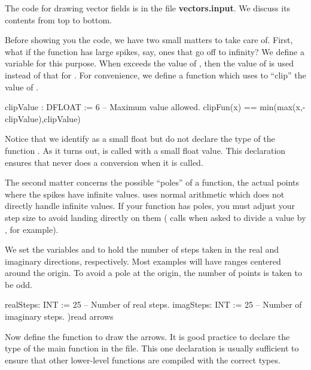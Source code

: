 The code for drawing vector fields is in the file {\bf vectors.input}.
We discuss its contents from top to bottom.

Before showing you the code, we have two small
matters to take care of.
First, what if the function has large spikes, say, ones that go off
to infinity?
We define a variable  for this purpose. When
 exceeds the value of , then the value of
 is used instead of that for .
For convenience, we define a function  which uses
 to ``clip'' the value of .

%
\begin{xmpLines}
clipValue : DFLOAT := 6                              -- Maximum value allowed.
clipFun(x) == min(max(x,-clipValue),clipValue)
\end{xmpLines}

Notice that we identify  as a small float but do
not declare the type of the function .
As it turns out,  is called with a
small float value.
This declaration ensures that  never does a
conversion when it is called.

The second matter concerns the possible ``poles'' of a
function, the actual points where the spikes have infinite
values.
\Language{} uses normal  arithmetic  which
does not directly handle infinite values.
If your function has poles, you must adjust your step size to
avoid landing directly on them (\Language{} calls 
when asked to divide a value by , for example).

We set the variables  and  to
hold the number of steps taken in the real and imaginary
directions, respectively.
Most examples will have ranges centered around the origin.
To avoid a pole at the origin, the number of points is taken
to be odd.

\begin{xmpLinesNoReset}
realSteps: INT := 25                                 -- Number of real steps.
imagSteps: INT := 25                                 -- Number of imaginary steps.
)read arrows
\end{xmpLinesNoReset}

Now define the function  to draw the arrows.
It is good practice to declare the type of the main function in
the file.
This one declaration is usually sufficient to ensure that other
lower-level functions are compiled with the correct types.

